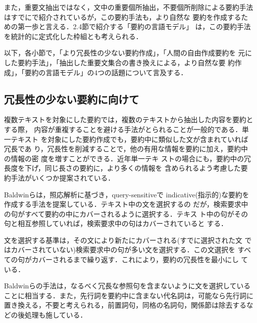 また，重要文抽出ではなく，文中の重要個所抽出，不要個所削除による要約手法
はすでに\cite{okumura:99:a}で紹介されているが，この要約手法も，より自然な
要約を作成するための第一歩と言える．2.4節で紹介する「要約の言語モデル」
は，この要約手法を統計的に定式化した枠組とも考えられる．

以下，各小節で，「より冗長性の少ない要約作成」，「人間の自由作成要約を
元にした要約手法」，「抽出した重要文集合の書き換えによる，より自然な要
約作成」，「要約の言語モデル」の4つの話題について言及する．

\subsection{冗長性の少ない要約に向けて}

複数テキストを対象にした要約では，複数のテキストから抽出した内容を要約とする際，
内容が重複することを避ける手法がとられることが一般的である．単一テキスト
を対象にした要約作成でも，要約中に類似した文が含まれていれば冗長であ
り，冗長性を削減することで，他の有用な情報を要約に加え，要約中の情報の密
度を増すことができる．近年単一テキ
ストの場合にも，要約中の冗長度を下げ，同じ長さの要約に，より多くの情報を
含められるよう考慮した要約手法がいくつか提案されている．

Baldwinら\cite{baldwin:98:a}は，照応解析に基づき，query-sensitiveで
indicative(指示的)な要約を作成する手法を提案している．テキスト中の文を選択するの
だが，検索要求中の句がすべて要約の中にカバーされるように選択する．テキス
ト中の句がその句と相互参照していれば，検索要求中の句はカバーされていると
する．

文を選択する基準は，その文により新たにカバーされる(すでに選択された文
ではカバーされていない)検索要求中の句が多い文を選択する．この文選択を
すべての句がカバーされるまで繰り返す．これにより，要約の冗長性を最小にし
ている．

Baldwinらの手法は，なるべく冗長な参照句を含まないように文を選択している
ことに相当する．また，先行詞を要約中に含まない代名詞は，可能なら先行詞に
置き換える，不要と考えられる，前置詞句，同格の名詞句，関係節は除去するな
どの後処理も施している．

